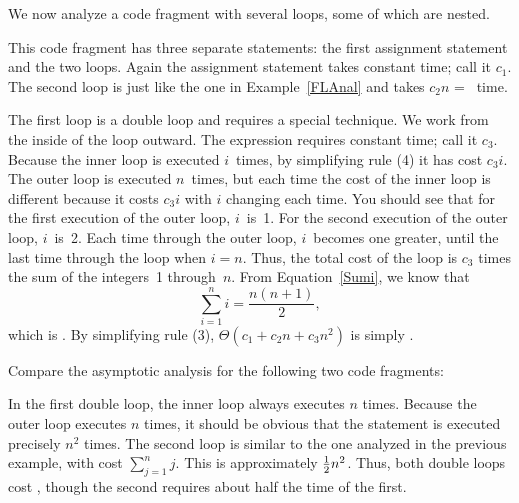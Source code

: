 \begin{example}
We now analyze a code fragment with several 
loops, some of which are nested.

\vspace{-\medskipamount}

\vspace{-\medskipamount}
This code fragment has three separate statements: the
first assignment statement and the two  loops.
Again the assignment statement takes constant time;
call it \(c_1\).
The second  loop is just like the one in
Example~\ref{FLAnal} and takes \(c_2 n\) = \Thetan\ time.

The first  loop is a double loop and requires a special
technique.
We work from the inside of the loop outward.
The expression  requires constant time; call it \(c_3\).
Because the inner  loop is executed \(i\)~times,
by simplifying rule (4) it has cost \(c_3i\).
The outer  loop is executed \(n\)~times, but each time
the cost of the inner loop is different because it costs \(c_3i\) with
\(i\) changing each time.
You should see that for the first execution of the outer loop,
\(i\)~is~1.
For the second execution of the outer loop, \(i\)~is~2.
Each time through the outer loop, \(i\)~becomes one greater, until
the last time through the loop when \(i = n\).
Thus, the total cost of the loop is \(c_3\) times the sum of the
integers~1 through~\(n\).
From Equation~\ref{Sumi}, we know that
\[\sum_{i = 1}^{n} i = \frac{n (n+1)}{2},\]
which is \Thetantwo.
By simplifying rule (3), \(\Theta(c_1 + c_2 n + c_3 n^2)\) is
simply \Thetantwo.
\end{example}

\begin{example}
Compare the asymptotic analysis for the following two code
fragments:


In the first double loop, the inner  loop always executes
\(n\) times.
Because the outer loop executes \(n\) times, it should be obvious
that the statement  is executed precisely \(n^2\) times.
The second loop is similar to the one analyzed in the previous
example, with cost \(\sum_{j = 1}^{n} j\).
This is approximately \({1 \over 2} n^2\).
Thus, both double loops cost \Thetantwo, though the second requires
about half the time of the first.
\end{example}

